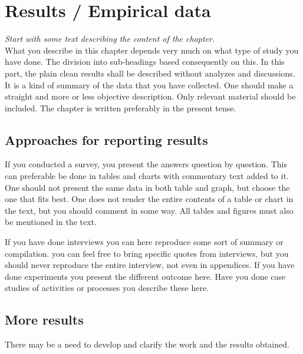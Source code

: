 \chapter{Results / Empirical data}
\emph{Start with some text describing the content of the chapter.}\\

\noindent What you describe in this chapter depends very much on what type of study you have done. The division into sub-headings based consequently on this. In this part, the plain clean results shall be described without analyzes and discussions. It is a kind of summary of the data that you have collected. One should make a straight and more or less objective description. Only relevant material should be included. The chapter is written preferably in the present tense.
		
\section{Approaches for reporting results}
If you conducted a survey, you present the answers question by question. This can preferable be done in tables and charts with commentary text added to it. One should not present the same data in both table and graph, but choose the one that fits best. One does not render the entire contents of a table or chart in the text, but you should comment in some way. All tables and figures must also be mentioned in the text.

If you have done interviews you can here reproduce some sort of summary or compilation. you can feel free to bring specific quotes from interviews, but you should never reproduce the entire interview, not even in appendices. If you have done experiments you present the different outcome here. Have you done case studies of activities or processes you describe these here.

\section{More results}	
There may be a need to develop and clarify the work and the results obtained.
